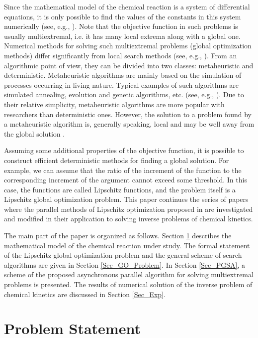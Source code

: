 \documentclass{svproc}
\begin{document}
Since the mathematical model of the chemical reaction is a system of differential equations, it is only possible to find the values of the constants in this system numerically (see, e.g., \cite{RSD}). Note that the objective function in such problems is usually multiextremal, i.e. it has many local extrema along with a global one.
Numerical methods for solving such multiextremal problems (global optimization methods) differ significantly from local search methods (see, e.g., \cite{Sergeyev2017, PaulaviciusZilinskas2014}). From an algorithmic point of view, they can be divided into two classes: metaheuristic and deterministic. Metaheuristic algorithms are mainly based on the simulation of processes occurring in living nature. Typical examples of such algorithms are simulated annealing, evolution and genetic algorithms, etc. (see, e.g., \cite{Battiti2009,Eiben2015}).     Due to their relative simplicity, metaheuristic algorithms are more popular with researchers than deterministic ones.  However, the solution to a problem found by a metaheuristic algorithm is, generally speaking, local and may be well away from the global solution \cite{Kvasov2018}.

Assuming some additional properties of the objective function, it is possible to construct efficient deterministic methods for finding a global solution. For example, we can assume that the ratio of the increment of the function to the corresponding increment of the argument cannot exceed some threshold. In this case, the functions are called Lipschitz functions, and the problem itself is a Lipschitz global optimization problem.
This paper continues the series of papers where the parallel methods of Lipschitz optimization proposed in \cite{Strongin2000} are investigated and modified in their application to solving inverse problems of chemical kinetics.

The main part of the paper is organized as follows. Section \ref{Sec_math_mod} describes the mathematical model of the chemical reaction under study. The formal statement of the Lipschitz global optimization problem and the general scheme of search algorithms are given in Section \ref{Sec_GO_Problem}. In Section \ref{Sec_PGSA}, a scheme of the proposed asynchronous parallel algorithm for solving multiextremal problems is presented. The results of numerical solution of the inverse problem of chemical kinetics are discussed in Section \ref{Sec_Exp}.


\section{Problem Statement}\label{Sec_math_mod}
\end{document}
